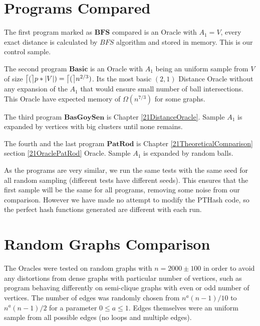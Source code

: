 \documentclass[shortabstract, lic, english]{iithesis}
\theoremstyle{definition} \newtheorem{definition}{Definition}[chapter]
\theoremstyle{remark} \newtheorem{remark}[definition]{Observation}
\theoremstyle{plain} \newtheorem{theorem}[definition]{Theorem}
\theoremstyle{plain} \newtheorem{lemma}[definition]{Lemma}
\theoremstyle{plain} \newtheorem{conjecture}[definition]{Conjecture}
\DeclarePairedDelimiter{\ceil}{\lceil}{\rceil}
\begin{document}
\section{Programs Compared}

The first program marked as $\mathbf{BFS}$ compared is an Oracle with $A_1 = V$, 
every exact distance is calculated by $BFS$ algorithm and stored in memory.
This is our control sample.

The second program $\mathbf{Basic}$ is an Oracle with $A_1$ being an uniform sample from $V$ of size $\ceil[\big](p*|V|) = \ceil[\big](n^{2/3})$.
Its the most basic $(2,1)$ Distance Oracle without any expansion of the $A_1$ that would ensure small number of ball intersections.
This Oracle have expected memory of $\Omega(n^{7/3})$ for some graphs.

The third program $\mathbf{BasGoySen}$ is Chapter \ref{21DistanceOracle}. Sample $A_1$ is expanded by vertices with big clusters until none remains.

The fourth and the last program $\mathbf{PatRod}$ is Chapter \ref{21TheoreticalComparison} section \ref{21OraclePatRod} Oracle. Sample $A_1$ is expanded by random balls.

As the programs are very similar, we run the same tests with the same seed for all random sampling (different tests have different seeds).
This ensures that the first sample will be the same for all programs, removing some noise from our comparison.
However we have made no attempt to modify the PTHash code, so the perfect hash functions generated are different with each run.



\section{Random Graphs Comparison}

The Oracles were tested on random graphs with $n = 2000 \pm 100$ in order to avoid any distortions from dense graphs with particular number of vertices, such as program behaving differently on semi-clique graphs with even or odd number of vertices.
The number of edges was randomly chosen from $n^a(n - 1)/10$ to $n^a(n-1)/2$ for a parameter $0 \leq a \leq 1$.
Edges themselves were an uniform sample from all possible edges (no loops and multiple edges).
\end{document}
